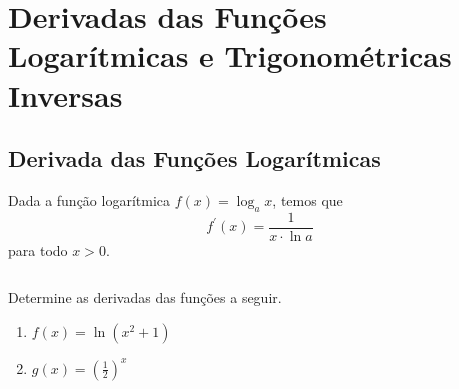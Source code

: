 \section{Derivadas das Funções Logarítmicas e Trigonométricas Inversas}

\subsection{Derivada das Funções Logarítmicas}
\begin{frame}
  \begin{theorem}
    Dada a função logarítmica $f(x) = \log_{a}{x}$, temos que 
    \begin{equation*}
      f^{\prime}(x) = \frac{1}{x\cdot\ln{a}}
    \end{equation*}
    para todo $x>0$.
  \end{theorem}
  \begin{columns}[onlytextwidth]
    \begin{column}{0.55\textwidth}
      \begin{example-highlight}
        Determine as derivadas das funções a seguir.
        \begin{enumerate}
          \item $f(x) = \ln{(x^{2} + 1)}$
          \item $\displaystyle g(x) = \left(\frac{1}{2}\right)^{x}$
        \end{enumerate}
      \end{example-highlight}
    \end{column}
    \begin{column}{0.43\textwidth}
    \end{column}
  \end{columns}
\end{frame}

